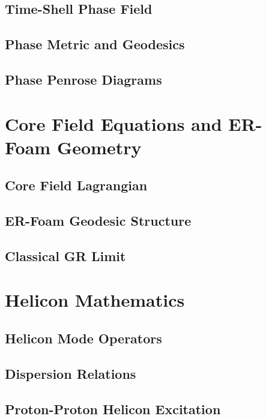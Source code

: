 \subsection{Time-Shell Phase Field}

\subsection{Phase Metric and Geodesics}

\subsection{Phase Penrose Diagrams}

\section{Core Field Equations and ER-Foam Geometry}
\label{app:corefield}

\subsection{Core Field Lagrangian}

\subsection{ER-Foam Geodesic Structure}

\subsection{Classical GR Limit}

\section{Helicon Mathematics}
\label{app:helicon-math}

\subsection{Helicon Mode Operators}

\subsection{Dispersion Relations}

\subsection{Proton-Proton Helicon Excitation}

